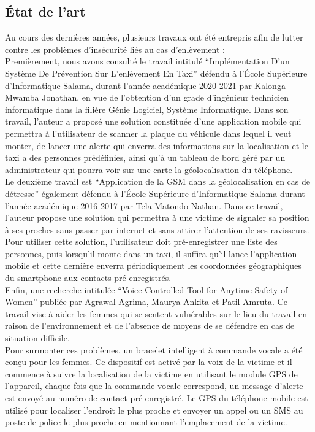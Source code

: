 \subsection{État de l'art}
Au cours des dernières années, plusieurs travaux ont été entrepris afin de lutter contre les problèmes d'insécurité liés au cas d'enlèvement : \\

Premièrement, nous avons consulté le travail intitulé “Implémentation D'un Système De Prévention Sur L'enlèvement En Taxi” défendu à l’École Supérieure d’Informatique Salama, durant l’année académique 2020-2021 par Kalonga Mwamba Jonathan, en vue de l’obtention d’un grade d’ingénieur technicien informatique dans la filière Génie Logiciel, Système Informatique. Dans son travail, l’auteur a proposé une solution constituée d’une application mobile qui permettra à l’utilisateur de scanner la plaque du véhicule dans lequel il veut monter, de lancer une alerte qui enverra des informations sur la localisation et le taxi a des personnes prédéfinies, ainsi qu'à un tableau de bord géré par un administrateur qui pourra voir sur une carte la géolocalisation du téléphone.\\

Le deuxième travail est “Application de la GSM dans la géolocalisation en cas de détresse” également défendu à l’École Supérieure d’Informatique Salama durant l’année académique 2016-2017 par Tela Matondo Nathan. Dans ce travail, l’auteur propose une solution qui permettra à une victime de signaler sa position à ses proches sans passer par internet et sans attirer l’attention de ses ravisseurs. Pour utiliser cette solution, l’utilisateur doit pré-enregistrer une liste des personnes, puis lorsqu’il monte dans un taxi, il suffira qu’il lance l’application mobile et cette dernière enverra périodiquement les coordonnées géographiques du smartphone aux contacts pré-enregistrés.\\

Enfin, une recherche intitulée “Voice-Controlled Tool for Anytime Safety of Women” \cite{voice_controlled} publiée par Agrawal Agrima, Maurya Ankita et Patil Amruta. Ce travail vise à aider les femmes qui se sentent vulnérables sur le lieu du travail en raison de l'environnement et de l'absence de moyens de se défendre en cas de situation difficile.\\

Pour surmonter ces problèmes, un bracelet intelligent à commande vocale a été conçu pour les femmes. Ce dispositif est activé par la voix de la victime et il commence à suivre la localisation de la victime en utilisant le module GPS de l'appareil, chaque fois que la commande vocale correspond, un message d'alerte est envoyé au numéro de contact pré-enregistré. Le GPS du téléphone mobile est utilisé pour localiser l'endroit le plus proche et envoyer un appel ou un SMS au poste de police le plus proche en mentionnant l'emplacement de la victime.

